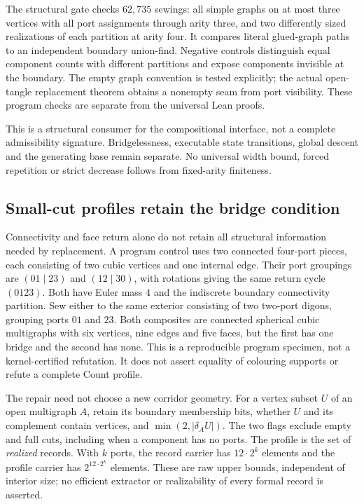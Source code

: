 The structural gate checks $62{,}735$ sewings: all simple graphs on at most
three vertices with all port assignments through arity three, and two
differently sized realizations of each partition at arity four. It
compares literal glued-graph paths to an independent boundary union-find.
Negative controls distinguish equal component counts with different
partitions and expose components invisible at the boundary. The empty
graph convention is tested explicitly; the actual open-tangle
replacement theorem obtains a nonempty seam from port visibility.
These program checks are separate from the universal Lean proofs.

This is a structural consumer for the compositional interface, not a
complete admissibility signature. Bridgelessness, executable state
transitions, global descent and the generating base remain separate.
No universal width bound, forced repetition or strict decrease follows
from fixed-arity finiteness.

\subsection{Small-cut profiles retain the bridge condition}
\label{sec:boundary-small-cut-profile}

Connectivity and face return alone do not retain all structural
information needed by replacement. A program control uses two connected
four-port pieces, each consisting of two cubic vertices and one internal
edge. Their port groupings are $(01\mid23)$ and $(12\mid30)$, with
rotations giving the same return cycle $(0123)$. Both have Euler mass
$4$ and the indiscrete boundary connectivity partition. Sew either to
the same exterior consisting of two two-port digons, grouping ports
$01$ and $23$. Both composites are connected spherical cubic
multigraphs with six vertices, nine edges and five faces, but the first
has one bridge and the second has none. This is a reproducible program
specimen, not a kernel-certified refutation. It does not assert equality
of colouring supports or refute a complete Count profile.

The repair need not choose a new corridor geometry. For a vertex subset
$U$ of an open multigraph $A$, retain its boundary membership bits,
whether $U$ and its complement contain vertices, and
$\min(2,|\delta_A U|)$. The two flags exclude empty and full cuts,
including when a component has no ports. The profile is the set of
\emph{realized} records. With $k$ ports, the record carrier has
$12\cdot2^k$ elements and the profile carrier has
$2^{12\cdot2^k}$ elements. These are raw upper bounds, independent of
interior size; no efficient extractor or realizability of every formal
record is asserted.

